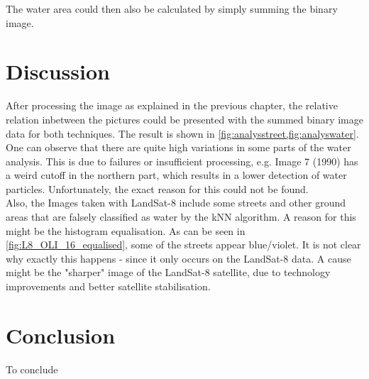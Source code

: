 The water area could then also be calculated by simply summing the binary image.

\section{Discussion}
After processing the image as explained in the previous chapter, the relative relation inbetween the pictures could be presented with the summed binary image data for both techniques. The result is shown in \cref{fig:analysstreet,fig:analyswater}. \\
One can observe that there are quite high variations in some parts of the water analysis. This is due to failures or insufficient processing, e.g. Image 7 (1990) has a weird cutoff in the northern part, which results in a lower detection of water particles. Unfortunately, the exact reason for this could not be found.\\
Also, the Images taken with LandSat-8 include some streets and other ground areas that are falsely classified as water by the kNN algorithm. A reason for this might be the histogram equalisation. As can be seen in \cref{fig:L8_OLI_16_equalised}, some of the streets appear blue/violet. It is not clear why exactly this happens - since it only occurs on the LandSat-8 data. A cause might be the "sharper" image of the LandSat-8 satellite, due to technology improvements and better satellite stabilisation.


\begin{figure}[h!]
\centering
\begin{minipage}{.5\textwidth}
	\centering
	\label{fig:analysstreet}
\end{minipage}%
\begin{minipage}{.5\textwidth}
	\centering
	\label{fig:analyswater}
\end{minipage}
\end{figure}



\section{Conclusion}

To conclude



